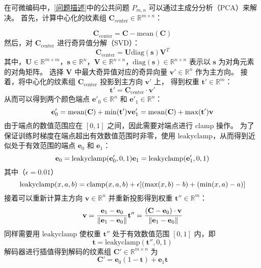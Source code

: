在可微编码中，\ref{问题描述}中的公共问题 $P_{m,n}$ 可以通过主成分分析（PCA）来解决。
首先，计算中心化的纹素组 $\mathbf{C}_{\text{center}}\in\mathbb{R}^{m\times n}$：

\begin{equation}
\mathbf{C}_{\text{center}}=\mathbf{C}-\text{mean}(\mathbf{C})
\end{equation}
然后，对 $\mathbf{C}_{\text{center}}$ 进行奇异值分解（SVD）：
\begin{equation}
\mathbf{C}_{\text{center}}=\mathbf{U}\text{diag}(\mathbf{s})\mathbf{V}^T
\end{equation}
其中，$\mathbf{U}\in \mathbb{R}^{m \times m}$，$\mathbf{s}\in \mathbb{R}^{n}$，$\mathbf{V}\in \mathbb{R}^{n\times n}$，$\text{diag}(\mathbf{s})\in\mathbb{R}^{n\times n}$ 表示以 $\mathbf{s}$ 为对角元素的对角矩阵。
选择 $\mathbf{V}$ 中最大奇异值对应的奇异向量 $\mathbf{v}'\in \mathbb{R}^{n}$ 作为主方向。
接着，将中心化的纹素组 $\mathbf{C}_\text{center}$ 投影到主方向 $\mathbf{v}'$ 上，
得到权重 $\mathbf{t}'\in\mathbb{R}^{m}$：
\begin{equation}
\mathbf{t}'=\mathbf{C}_{\text{center}}\cdot\mathbf{v}'
\end{equation}
从而可以得到两个颜色端点 $\mathbf{e}'_0\in\mathbb{R}^n$ 和 $\mathbf{e}'_1\in\mathbb{R}^n$：
\begin{equation}
\mathbf{e}'_0=\text{mean}(\mathbf{C})+\text{min}(\mathbf{t}')\mathbf{v}\\
\mathbf{e}'_1=\text{mean}(\mathbf{C})+\text{max}(\mathbf{t}')\mathbf{v}
\end{equation}
由于端点的数值范围应在 $[0,1]$ 之间，因此需要对端点进行 clamp 操作。
为了保证训练时梯度在端点超出有效数值范围时非零，使用 $\text{leakyclamp}$，从而得到近似处于有效范围的端点 $\mathbf{e}_0$ 和 $\mathbf{e}_1$：
\begin{equation}
\mathbf{e}_0=\text{leakyclamp}(\mathbf{e}'_0,0,1)\\
\mathbf{e}_1=\text{leakyclamp}(\mathbf{e}'_1,0,1)
\end{equation}
其中（$\epsilon=0.01$）
\begin{equation}
\text{leakyclamp}(x,a,b)=\text{clamp}(x,a,b)\\
                        +\epsilon[(\max(x,b)-b)+(\min(x,a)-a)]
\end{equation}
接着可以重新计算主方向 $\mathbf{v}\in\mathbb{R}^n$ 并重新投影得到权重 $\mathbf{t}''\in\mathbb{R}^m$：
\begin{equation}
\mathbf{v}=\frac{\mathbf{e}_1-\mathbf{e}_0}{\|\mathbf{e}_1-\mathbf{e}_0\|}\\
\mathbf{t}''=\frac{(\mathbf{C}-\mathbf{e}_0)\cdot\mathbf{v}}{\|\mathbf{e}_1-\mathbf{e}_0\|}
\end{equation}
同样需要用 $\text{leakyclamp}$ 使权重 $\mathbf{t}''$ 处于有效数值范围 $[0,1]$ 内，即
\begin{equation}
\mathbf{t}=\text{leakyclamp}(\mathbf{t}'',0,1)
\end{equation}
解码器进行插值得到解码的纹素组 $\mathbf{C}'\in\mathbb{R}^{m\times n}$ 为
\begin{equation}
\mathbf{C}'=\mathbf{e}_0(1-\mathbf{t})+\mathbf{e}_1\mathbf{t}
\end{equation}

